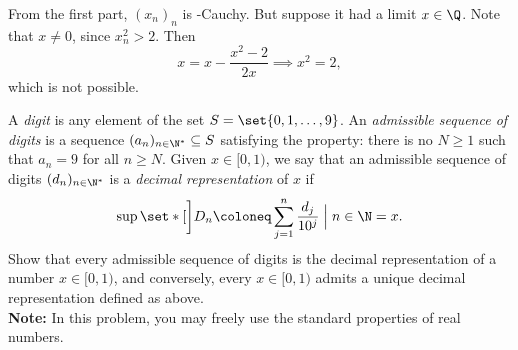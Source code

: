 \documentclass[12pt]{article}
\begin{document}
\begin{solution}
\begin{enumerate}[label=(\arabic*)]
        From the first part, $(x_n)_n$ is \Q-Cauchy.
        But suppose it had a limit $x \in \Q$.
        Note that $x \ne 0$, since $x_n^2 > 2$.
        Then \[
            x = x - \frac{x^2 - 2}{2x} \implies x^2 = 2,
        \] which is not possible. \qedhere
    \end{enumerate}
\end{solution}

\begin{problem*}
    A \emph{digit} is any element of the set $S = \set{0, 1, \dots, 9}$.
    An \emph{admissible sequence of digits} is a sequence
    $(a_n)_{n \in \N^*} \subseteq S$ satisfying the property:
    there is no $N \ge 1$ such that $a_n = 9$ for all $n \ge N$.
    Given $x \in [0, 1)$, we say that an admissible sequence of digits
    $(d_n)_{n \in \N^*}$ is a \emph{decimal representation} of $x$ if \[
        \sup\set*[\bigg]{D_n \coloneq \sum_{j=1}^n \frac{d_j}{10^j}
            \Bigm\vert n \in \N} = x.
    \] Show that every admissible sequence of digits is the decimal
    representation of a number $x \in [0, 1)$, and conversely, every
    $x \in [0, 1)$ admits a unique decimal representation defined as above.
    \\
    \textbf{Note:} In this problem, you may freely use the standard
    properties of real numbers.
\end{problem*}
\end{document}
